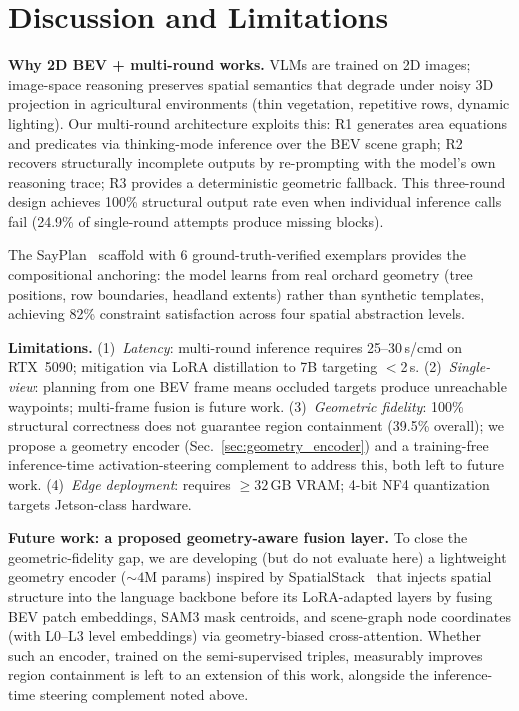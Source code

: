 \documentclass{article}
\begin{document}
\section{Discussion and Limitations}
\label{sec:discussion}

\textbf{Why 2D BEV + multi-round works.}
VLMs are trained on 2D images; image-space reasoning preserves spatial semantics that degrade under noisy 3D projection in agricultural environments (thin vegetation, repetitive rows, dynamic lighting). Our multi-round architecture exploits this: R1 generates area equations and predicates via thinking-mode inference over the BEV scene graph; R2 recovers structurally incomplete outputs by re-prompting with the model's own reasoning trace; R3 provides a deterministic geometric fallback. This three-round design achieves 100\% structural output rate even when individual inference calls fail (24.9\% of single-round attempts produce missing blocks).

The SayPlan~\citep{rana2023sayplan} scaffold with 6 ground-truth-verified exemplars provides the compositional anchoring: the model learns from real orchard geometry (tree positions, row boundaries, headland extents) rather than synthetic templates, achieving 82\% constraint satisfaction across four spatial abstraction levels.

\textbf{Limitations.}
(1)~\emph{Latency}: multi-round inference requires 25--30\,s/cmd on RTX~5090; mitigation via LoRA distillation to 7B targeting $<$2\,s.
(2)~\emph{Single-view}: planning from one BEV frame means occluded targets produce unreachable waypoints; multi-frame fusion is future work.
(3)~\emph{Geometric fidelity}: 100\% structural correctness does not guarantee region containment (39.5\% overall); we propose a geometry encoder (Sec.~\ref{sec:geometry_encoder}) and a training-free inference-time activation-steering complement to address this, both left to future work.
(4)~\emph{Edge deployment}: requires ${\geq}32$\,GB VRAM; 4-bit NF4 quantization targets Jetson-class hardware.

\textbf{Future work: a proposed geometry-aware fusion layer.}
\label{sec:geometry_encoder}
To close the geometric-fidelity gap, we are developing (but do not evaluate here) a lightweight geometry encoder (${\sim}4$M params) inspired by SpatialStack~\citep{zhang2026spatialstack} that injects spatial structure into the language backbone before its LoRA-adapted layers by fusing BEV patch embeddings, SAM3 mask centroids, and scene-graph node coordinates (with L0--L3 level embeddings) via geometry-biased cross-attention. Whether such an encoder, trained on the semi-supervised triples, measurably improves region containment is left to an extension of this work, alongside the inference-time steering complement noted above.
\end{document}
